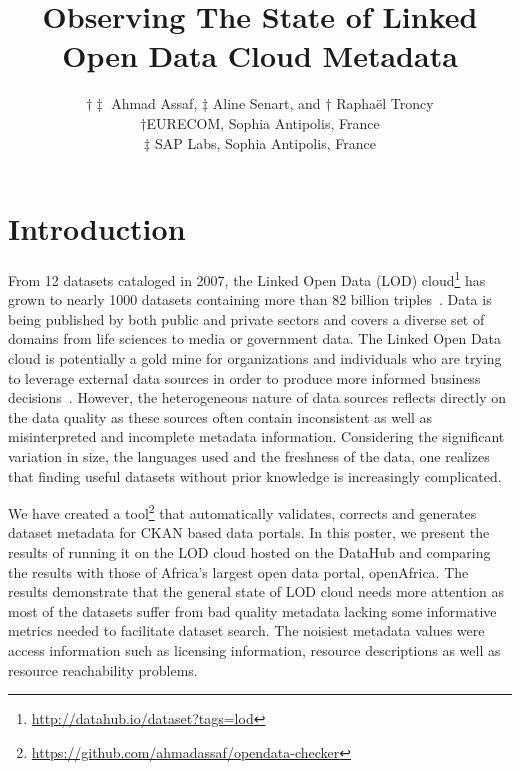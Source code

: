 \documentclass{../../Tools/LaTEX/sig-alternate}
\begin{document}


\title{Observing The State of Linked Open Data Cloud Metadata}

\author{\alignauthor $\dagger\ddagger$ Ahmad Assaf, $\ddagger$ Aline Senart, and $\dagger$ Rapha\"{e}l Troncy \\
\affaddr$\dagger${EURECOM, Sophia Antipolis, France} \\ \affaddr$\ddagger${ SAP Labs, Sophia Antipolis, France} \\
}

\maketitle



\section{Introduction}
From 12 datasets cataloged in 2007, the Linked Open Data (LOD) cloud\footnote{\url{http://datahub.io/dataset?tags=lod}} has grown to nearly 1000 datasets containing more than 82 billion triples~\cite{Bizer:IJSWIS:09}. Data is being published by both public and private sectors and covers a diverse set of domains from life sciences to media or government data. The Linked Open Data cloud is potentially a gold mine for organizations and individuals who are trying to leverage external data sources in order to produce more informed business decisions~\cite{Boyd:Article:11}. However, the heterogeneous nature of data sources reflects directly on the data quality as these sources often contain inconsistent as well as misinterpreted and incomplete metadata information. Considering the significant variation in size, the languages used and the freshness of the data, one realizes that finding useful datasets without prior knowledge is increasingly complicated.

We have created a tool\footnote{\url{https://github.com/ahmadassaf/opendata-checker}} that automatically validates, corrects and generates dataset metadata for CKAN based data portals. In this poster, we present the results of running it on the LOD cloud hosted on the DataHub and comparing the results with those of Africa's largest open data portal, openAfrica. The results demonstrate that the general state of LOD cloud needs more attention as most of the datasets suffer from bad quality metadata lacking some informative metrics needed to facilitate dataset search. The noisiest metadata values were access information such as licensing information, resource descriptions as well as resource reachability problems.
\end{document}
